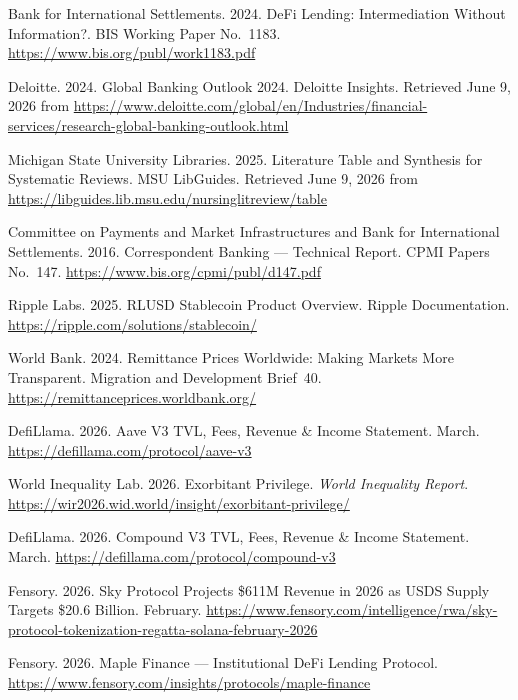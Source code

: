 \documentclass[12pt,a4paper]{report}
\begin{document}
{\begin{enumerate}[label={[\arabic*]}]
\item Bank for International Settlements. 2024. DeFi Lending: Intermediation Without Information?. BIS Working Paper No.~1183. \url{https://www.bis.org/publ/work1183.pdf}

\item Deloitte. 2024. Global Banking Outlook 2024. Deloitte Insights. Retrieved June 9, 2026 from \url{https://www.deloitte.com/global/en/Industries/financial-services/research-global-banking-outlook.html}

\item Michigan State University Libraries. 2025. Literature Table and Synthesis for Systematic Reviews. MSU LibGuides. Retrieved June 9, 2026 from \url{https://libguides.lib.msu.edu/nursinglitreview/table}

\item Committee on Payments and Market Infrastructures and Bank for International Settlements. 2016. Correspondent Banking --- Technical Report. CPMI Papers No.~147. \url{https://www.bis.org/cpmi/publ/d147.pdf}

\item Ripple Labs. 2025. RLUSD Stablecoin Product Overview. Ripple Documentation. \url{https://ripple.com/solutions/stablecoin/}

\item World Bank. 2024. Remittance Prices Worldwide: Making Markets More Transparent. Migration and Development Brief~40. \url{https://remittanceprices.worldbank.org/}

\item DefiLlama. 2026. Aave V3 TVL, Fees, Revenue \& Income Statement. March. \url{https://defillama.com/protocol/aave-v3}

\item World Inequality Lab. 2026. Exorbitant Privilege. \emph{World Inequality Report}. \url{https://wir2026.wid.world/insight/exorbitant-privilege/}

\item DefiLlama. 2026. Compound V3 TVL, Fees, Revenue \& Income Statement. March. \url{https://defillama.com/protocol/compound-v3}

\item Fensory. 2026. Sky Protocol Projects \$611M Revenue in 2026 as USDS Supply Targets \$20.6 Billion. February. \url{https://www.fensory.com/intelligence/rwa/sky-protocol-tokenization-regatta-solana-february-2026}

\item Fensory. 2026. Maple Finance --- Institutional DeFi Lending Protocol. \url{https://www.fensory.com/insights/protocols/maple-finance}


\end{enumerate}}
\end{document}
